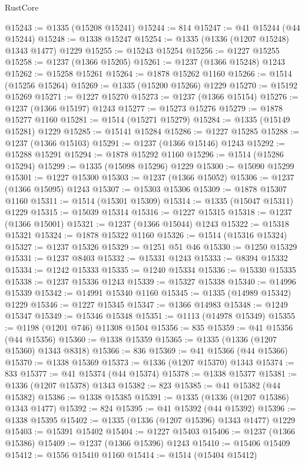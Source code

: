 \begin{lexlean}{RustCore}
\begin{coremodule}
@15243 := @1335 (@15208 @15241)
@15244 := 814
@15247 := @41 @15244 (@44 @15244)
@15248 := @1338 @15247
@15254 := @1335 (@1336 (@1207 @15248) @1343 @1477) @1229
@15255 := @15243 @15254
@15256 := @1227 @15255
@15258 := @1237 (@1366 @15205)
@15261 := @1237 (@1366 @15248) @1243
@15262 := @15258 @15261
@15264 := @1878 @15262 @1160
@15266 := @1514 (@15256 @15264)
@15269 := @1335 (@15200 @15266) @1229
@15270 := @15192 @15269
@15271 := @1227 @15270
@15273 := @1237 (@1366 @15154)
@15276 := @1237 (@1366 @15197) @1243
@15277 := @15273 @15276
@15279 := @1878 @15277 @1160
@15281 := @1514 (@15271 @15279)
@15284 := @1335 (@15149 @15281) @1229
@15285 := @15141 @15284
@15286 := @1227 @15285
@15288 := @1237 (@1366 @15103)
@15291 := @1237 (@1366 @15146) @1243
@15292 := @15288 @15291
@15294 := @1878 @15292 @1160
@15296 := @1514 (@15286 @15294)
@15299 := @1335 (@15098 @15296) @1229
@15300 := @15090 @15299
@15301 := @1227 @15300
@15303 := @1237 (@1366 @15052)
@15306 := @1237 (@1366 @15095) @1243
@15307 := @15303 @15306
@15309 := @1878 @15307 @1160
@15311 := @1514 (@15301 @15309)
@15314 := @1335 (@15047 @15311) @1229
@15315 := @15039 @15314
@15316 := @1227 @15315
@15318 := @1237 (@1366 @15001)
@15321 := @1237 (@1366 @15044) @1243
@15322 := @15318 @15321
@15324 := @1878 @15322 @1160
@15326 := @1514 (@15316 @15324)
@15327 := @1237 @15326
@15329 := @1251 @51 @46
@15330 := @1250 @15329
@15331 := @1237 @8403
@15332 := @15331 @1243
@15333 := @8394 @15332
@15334 := @1242 @15333
@15335 := @1240 @15334
@15336 := @15330 @15335
@15338 := @1237 @15336 @1243
@15339 := @15327 @15338
@15340 := @14996 @15339
@15342 := @14991 @15340 @1160
@15345 := @1335 (@14989 @15342) @1229
@15346 := @1227 @15345
@15347 := @1366 @14983
@15348 := @1249 @15347
@15349 := @15346 @15348
@15351 := @1113 (@14978 @15349)
@15355 := @1198 (@1201 @746) @11308 @1504
@15356 := 835
@15359 := @41 @15356 (@44 @15356)
@15360 := @1338 @15359
@15365 := @1335 (@1336 (@1207 @15360) @1343 @8318)
@15366 := 836
@15369 := @41 @15366 (@44 @15366)
@15370 := @1338 @15369
@15373 := @1336 (@1207 @15370) @1343
@15374 := 833
@15377 := @41 @15374 (@44 @15374)
@15378 := @1338 @15377
@15381 := @1336 (@1207 @15378) @1343
@15382 := 823
@15385 := @41 @15382 (@44 @15382)
@15386 := @1338 @15385
@15391 := @1335 (@1336 (@1207 @15386) @1343 @1477)
@15392 := 824
@15395 := @41 @15392 (@44 @15392)
@15396 := @1338 @15395
@15402 := @1335 (@1336 (@1207 @15396) @1343 @1477) @1229
@15403 := @15391 @15402
@15404 := @1227 @15403
@15406 := @1237 (@1366 @15386)
@15409 := @1237 (@1366 @15396) @1243
@15410 := @15406 @15409
@15412 := @1556 @15410 @1160
@15414 := @1514 (@15404 @15412)

\end{coremodule}
\end{lexlean}
